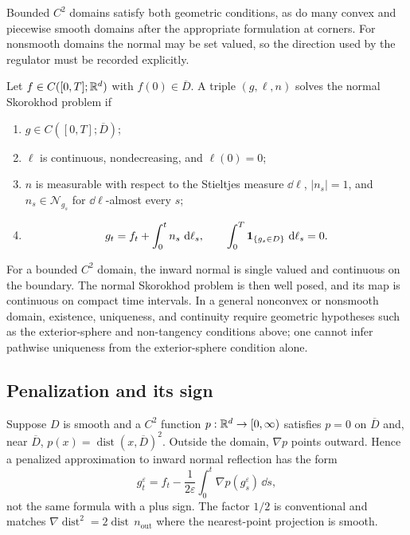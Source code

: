 Bounded $C^2$ domains satisfy both geometric conditions, as do many convex
and piecewise smooth domains after the appropriate formulation at corners.
For nonsmooth domains the normal may be set valued, so the direction used by
the regulator must be recorded explicitly.

\begin{definition}
Let $f\in C([0,T];\mathbb R^d)$ with $f(0)\in\overline D$. A triple
$(g,\ell,n)$ solves the normal Skorokhod problem if
\begin{enumerate}[label=(\roman*)]
  \item $g\in C([0,T];\overline D)$;
  \item $\ell$ is continuous, nondecreasing, and $\ell(0)=0$;
  \item $n$ is measurable with respect to the Stieltjes measure $\dd\ell$,
        $|n_s|=1$, and $n_s\in\mathcal N_{g_s}$ for
        $\dd\ell$-almost every $s$;
  \item
  \[
    g_t=f_t+\int_0^t n_s\,\mathop{}\!\mathrm d\ell_s,
    \qquad
    \int_0^T\mathbf 1_{\{g_s\in D\}}\,\mathop{}\!\mathrm d\ell_s=0.
  \]
\end{enumerate}
\end{definition}

\begin{remark}
For a bounded $C^2$ domain, the inward normal is single valued and continuous
on the boundary. The normal Skorokhod problem is then well posed, and its map
is continuous on compact time intervals. In a general nonconvex or
nonsmooth domain, existence, uniqueness, and continuity require geometric
hypotheses such as the exterior-sphere and non-tangency conditions above;
one cannot infer pathwise uniqueness from the exterior-sphere condition
alone.
\end{remark}

\subsection{Penalization and its sign}

Suppose $D$ is smooth and a $C^2$ function $p:\mathbb R^d\to[0,\infty)$ satisfies
$p=0$ on $\overline D$ and, near $\overline D$,
$p(x)=\operatorname{dist}(x,\overline D)^2$. Outside the domain,
$\nabla p$ points outward. Hence a penalized approximation to inward normal
reflection has the form
\begin{equation}
  g^\varepsilon_t
  =f_t-\frac1{2\varepsilon}
       \int_0^t\nabla p(g^\varepsilon_s)\,\dd s, \label{eq:normal-penalty}
\end{equation}
not the same formula with a plus sign. The factor $1/2$ is conventional and
matches $\nabla\operatorname{dist}^2=2\operatorname{dist}\,n_{\mathrm{out}}$
where the nearest-point projection is smooth.

